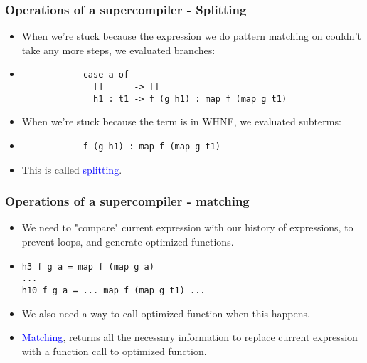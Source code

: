 \documentclass{beamer}
\begin{document}
\begin{frame}[fragile]

    \frametitle{Operations of a supercompiler - Splitting}

    \begin{itemize}[<+->]

        \item[]
            When we're stuck because the expression we do pattern matching on
            couldn't take any more steps, we evaluated branches:

        \item[]
            \begin{verbatim}
            case a of
              []      -> []
              h1 : t1 -> f (g h1) : map f (map g t1)
            \end{verbatim}

        \item[] When we're stuck because the term is in WHNF, we evaluated
            subterms:

        \item[]
            \begin{verbatim}
            f (g h1) : map f (map g t1)
            \end{verbatim}

        \item[]
            This is called \textcolor{blue}{splitting}.

    \end{itemize}

\end{frame}

\begin{frame}[fragile]

    \frametitle{Operations of a supercompiler - matching}

    \begin{itemize}[<+->]
        \item[]
            We need to "compare" current expression with our history of expressions, to
            prevent loops, and generate optimized functions.

        \item[]
            \begin{verbatim}
h3 f g a = map f (map g a)
...
h10 f g a = ... map f (map g t1) ...
            \end{verbatim}

        \item[]
            We also need a way to call optimized function when this happens.

        \item[] \textcolor{blue}{Matching}, returns all the necessary information to
            replace current expression with a function call to optimized
            function.

    \end{itemize}

\end{frame}
\end{document}
